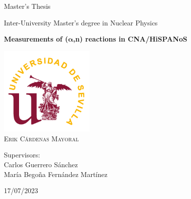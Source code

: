 \documentclass[a4paper,12pt]{report}
\begin{document}
\begin{titlepage}
	\centering
	\Large Master's Thesis\par
	\Huge Inter-University Master's degree in Nuclear Physics\par
	\vspace*{3cm}
	\HUGE \textbf{Measurements of ($\bm{\alpha}$,n) reactions in CNA/HiSPANoS}\par	%
	\vspace{1cm}
	\includegraphics[width=0.35\textwidth]{us.png}\\
	\vspace{1cm}
	\Large \textsc{Erik Cárdenas Mayoral}\par
	\vspace{2cm}
	Supervisors:\\
	Carlos Guerrero Sánchez\\
	María Begoña Fernández Martínez\par
	\vfill
	17/07/2023
\end{titlepage}
\end{document}

